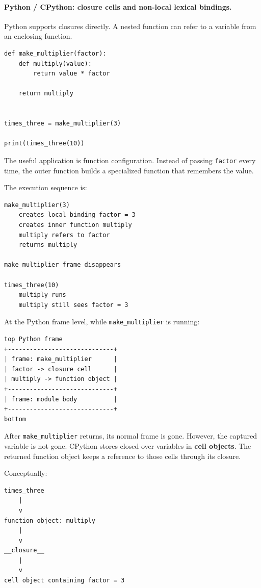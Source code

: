 \paragraph{Python / CPython: closure cells and non-local lexical bindings.}

Python supports closures directly. A nested function can refer to a variable from an enclosing function.

\begin{verbatim}
def make_multiplier(factor):
    def multiply(value):
        return value * factor

    return multiply


times_three = make_multiplier(3)

print(times_three(10))
\end{verbatim}

The useful application is function configuration. Instead of passing \texttt{factor} every time, the outer function builds a specialized function that remembers the value.

The execution sequence is:

\begin{verbatim}
make_multiplier(3)
    creates local binding factor = 3
    creates inner function multiply
    multiply refers to factor
    returns multiply

make_multiplier frame disappears

times_three(10)
    multiply runs
    multiply still sees factor = 3
\end{verbatim}

At the Python frame level, while \texttt{make\_multiplier} is running:

\begin{verbatim}
top Python frame
+-----------------------------+
| frame: make_multiplier      |
| factor -> closure cell      |
| multiply -> function object |
+-----------------------------+
| frame: module body          |
+-----------------------------+
bottom
\end{verbatim}

After \texttt{make\_multiplier} returns, its normal frame is gone. However, the captured variable is not gone. CPython stores closed-over variables in \textbf{cell objects}. The returned function object keeps a reference to those cells through its closure.

Conceptually:

\begin{verbatim}
times_three
    |
    v
function object: multiply
    |
    v
__closure__
    |
    v
cell object containing factor = 3
\end{verbatim}

